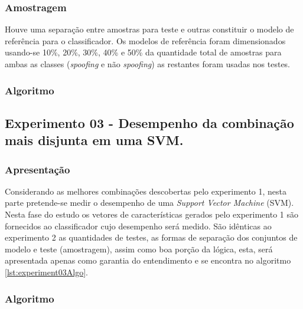 \begin{myenv}{1.5}
				\subsubsection{Amostragem}
					\par Houve uma separação entre amostras para teste e outras constituir o modelo de referência para o classificador. Os modelos de referência foram dimensionados usando-se 10\%, 20\%, 30\%, 40\% e 50\% da quantidade total de amostras para ambas as classes (\textit{spoofing} e não \textit{spoofing}) as restantes foram usadas nos testes.	
				\subsubsection{Algoritmo}
				

			\subsection{Experimento 03 - Desempenho da combinação mais disjunta em uma SVM.}
			\label{chap:propApproach:sec:Experimento03}
				\subsubsection{Apresentação}
					\par Considerando as melhores combinações descobertas pelo experimento 1, nesta parte pretende-se medir o desempenho de uma \textit{Support Vector Machine} (SVM). Nesta fase do estudo os vetores de características gerados pelo experimento 1 são fornecidos ao classificador cujo desempenho será medido. São idênticas ao experimento 2 as quantidades de testes, as formas de separação dos conjuntos de modelo e teste (amostragem), assim como boa porção da lógica, esta, será apresentada apenas como garantia do entendimento e se encontra no algoritmo \ref{lst:experiment03Algo}.

				\subsubsection{Algoritmo}
				
	\end{myenv}